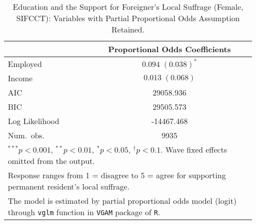 
\begin{table}
\caption{Education and the Support for Foreigner's Local Suffrage (Female, SIFCCT): Variables with Partial Proportional Odds Assumption Retained.}
\begin{center}
\begin{tabular}{l c }
\toprule
 & Proportional Odds Coefficients \\
\midrule
Employed       & $0.094 \; (0.038)^{*}$ \\
Income         & $0.013 \; (0.068)$     \\
\midrule
AIC            & 29058.936              \\
BIC            & 29505.573              \\
Log Likelihood & -14467.468             \\
Num.\ obs.     & 9935                   \\
\bottomrule
\multicolumn{2}{l}{\scriptsize{$^{***}p<0.001$, $^{**}p<0.01$, $^*p<0.05$, $^{\dagger}p<0.1$. Wave fixed effects omitted from the output.}} \\ \multicolumn{2}{l}{\scriptsize{Response ranges from 1 = disagree to 5 = agree for supporting permanent resident's local suffrage.}} \\ \multicolumn{2}{l}{\scriptsize{The model is estimated by partial proportional odds model (logit) through \texttt{vglm} function in \texttt{VGAM} package of \texttt{R}.}}
\end{tabular}
\label{goltab_smof_pr}
\end{center}
\end{table}

